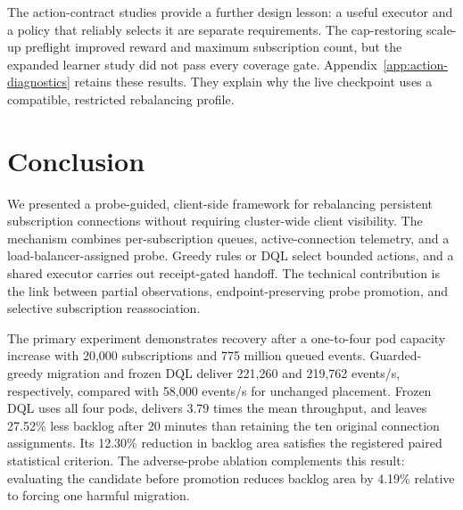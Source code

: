 \documentclass[manuscript]{acmart}
\begin{document}
The action-contract studies provide a further design lesson: a useful
executor and a policy that reliably selects it are separate requirements.
The cap-restoring scale-up preflight improved reward and maximum subscription
count, but the expanded learner study did not pass every coverage gate.
Appendix~\ref{app:action-diagnostics} retains these results. They explain why
the live checkpoint uses a compatible, restricted rebalancing profile.

\section{Conclusion}

We presented a probe-guided, client-side framework for rebalancing
persistent subscription connections without requiring cluster-wide client
visibility.  The mechanism combines per-subscription queues, active-connection
telemetry, and a load-balancer-assigned probe. Greedy rules or DQL select
bounded actions, and a shared executor carries out receipt-gated handoff.
The technical contribution is the link between partial observations,
endpoint-preserving probe promotion, and selective subscription reassociation.

The primary experiment demonstrates recovery after a one-to-four pod capacity
increase with 20,000 subscriptions and 775 million queued events. Guarded-greedy
migration and frozen DQL deliver 221,260 and 219,762 events/s, respectively,
compared with 58,000 events/s for unchanged placement. Frozen DQL
uses all four pods, delivers 3.79 times the mean throughput, and leaves 27.52\%
less backlog after 20 minutes than retaining the ten original connection
assignments. Its 12.30\% reduction in backlog area satisfies the registered
paired statistical criterion. The adverse-probe ablation complements this
result: evaluating the candidate before promotion reduces backlog area by
4.19\% relative to forcing one harmful migration.
\end{document}
